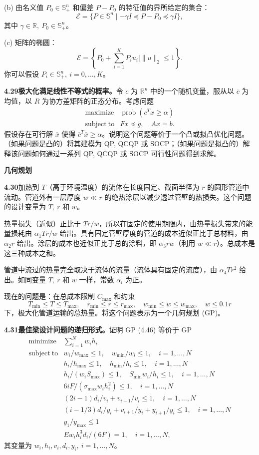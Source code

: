 \documentclass[UTF8,12pt,a4paper,fontset=fandol]{ctexart}
\begin{document}
(b) 由名义值 $P_0\in\mathbb{S}_+^n$ 和偏差 $P-P_0$ 的特征值的界所给定的集合：
\[
\mathcal{E}=\{P\in\mathbb{S}^n\mid -\gamma I\preceq P-P_0\preceq\gamma I\},
\]
其中 $\gamma\in\mathbb{R},\ P_0\in\mathbb{S}_+^n$。

(c) 矩阵的椭圆：
\[
\mathcal{E}=\left\{P_0+\sum_{i=1}^K P_iu_i\mid \|u\|_2\leq1\right\}.
\]
你可以假设 $P_i\in\mathbb{S}_+^n,\ i=0,\ldots,K$。

\noindent\textbf{4.29\quad 极大化满足线性不等式的概率。}\quad 令 $c$ 为 $\mathbb{R}^n$ 中的一个随机变量，服从以 $\overline{c}$ 为均值，以 $R$ 为协方差矩阵的正态分布。考虑问题
\[
\begin{array}{ll}
\mathop{\mathrm{maximize}} & \operatorname{prob}(c^Tx\geq\alpha)\\
\mathrm{subject\ to} & Fx\preceq g,\quad Ax=b.
\end{array}
\]
假设存在可行解 $\overline{x}$ 使得 $\overline{c}^T\overline{x}\geq\alpha$。说明这个问题等价于一个凸或拟凸优化问题。（如果问题是凸的）将其建模为 QP, QCQP 或 SOCP；（如果问题是拟凸的）解释该问题如何通过一系列 QP, QCQP 或 SOCP 可行性问题得到求解。

\noindent\textbf{几何规划}

\noindent\textbf{4.30}\quad 加热到 $T$（高于环境温度）的流体在长度固定、截面半径为 $r$ 的圆形管道中流动。管道外有一层厚度 $w\ll r$ 的绝热涂层以减少透过管壁的热损失。这个问题的设计变量为 $T,\ r$ 和 $w$。

热量损失（近似）正比于 $Tr/w$，所以在固定的使用期限内，由热量损失带来的能量损耗由 $\alpha_1Tr/w$ 给出。具有固定管壁厚度的管道的成本近似正比于总材料，由 $\alpha_2r$ 给出。涂层的成本也近似正比于总的涂料，即 $\alpha_3rw$（利用 $w\ll r$）。总成本是这三种成本之和。

管道中流过的热量完全取决于流体的流量（流体具有固定的流度），由 $\alpha_4Tr^2$ 给出。如同变量 $T,\ r$ 和 $w$ 一样，常数 $\alpha_i$ 为正。

现在的问题是：在总成本限制 $C_{\max}$ 和约束
\[
T_{\min}\leq T\leq T_{\max},\quad r_{\min}\leq r\leq r_{\max},\quad w_{\min}\leq w\leq w_{\max},\quad w\leq0.1r
\]
下，极大化管道运输的总热量。将这个问题表示为一个几何规划 (GP)。

\noindent\textbf{4.31\quad 最佳梁设计问题的递归形式。}\quad 证明 GP (4.46) 等价于 GP
\[
\begin{array}{ll}
\mathop{\mathrm{minimize}} & \displaystyle\sum_{i=1}^N w_ih_i\\
\mathrm{subject\ to} & w_i/w_{\max}\leq1,\quad w_{\min}/w_i\leq1,\quad i=1,\ldots,N\\
& h_i/h_{\max}\leq1,\quad h_{\min}/h_i\leq1,\quad i=1,\ldots,N\\
& h_i/(w_iS_{\max})\leq1,\quad S_{\min}w_i/h_i\leq1,\quad i=1,\ldots,N\\
& 6iF/(\sigma_{\max}w_ih_i^2)\leq1,\quad i=1,\ldots,N\\
& (2i-1)d_i/v_i+v_{i+1}/v_i\leq1,\quad i=1,\ldots,N\\
& (i-1/3)d_i/y_i+v_{i+1}/y_i+y_{i+1}/y_i\leq1,\quad i=1,\ldots,N\\
& y_1/y_{\max}\leq1\\
& Ew_ih_i^3d_i/(6F)=1,\quad i=1,\ldots,N,
\end{array}
\]
其变量为 $w_i,h_i,v_i,d_i,y_i,\ i=1,\ldots,N$。
\end{document}
